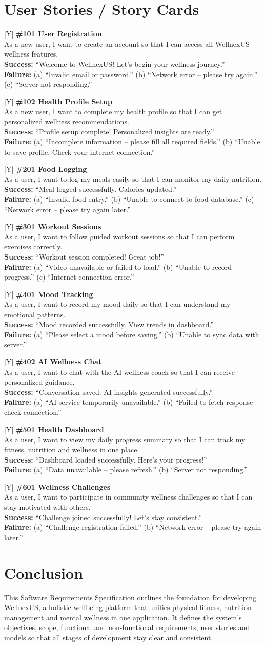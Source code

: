 \documentclass[11pt,a4paper]{report}
\newcommand{\storycard}[4]{\par\medskip\noindent\small
 \begin{tabularx}{\textwidth}{|Y|}\hline
 \textbf{\##1}\\\hline #2\\\hline
 \textbf{Success:} ``#3''\\\hline
 \textbf{Failure:} #4\\\hline\end{tabularx}\normalsize\par}
\begin{document}
\section{User Stories / Story Cards}
\storycard{101 User Registration}{As a new user, I want to create an account so that I can access all WellnexUS wellness features.}{Welcome to WellnexUS! Let's begin your wellness journey.}{(a) ``Invalid email or password.'' (b) ``Network error -- please try again.'' (c) ``Server not responding.''}
\storycard{102 Health Profile Setup}{As a new user, I want to complete my health profile so that I can get personalized wellness recommendations.}{Profile setup complete! Personalized insights are ready.}{(a) ``Incomplete information -- please fill all required fields.'' (b) ``Unable to save profile. Check your internet connection.''}
\storycard{201 Food Logging}{As a user, I want to log my meals easily so that I can monitor my daily nutrition.}{Meal logged successfully. Calories updated.}{(a) ``Invalid food entry.'' (b) ``Unable to connect to food database.'' (c) ``Network error -- please try again later.''}
\storycard{301 Workout Sessions}{As a user, I want to follow guided workout sessions so that I can perform exercises correctly.}{Workout session completed! Great job!}{(a) ``Video unavailable or failed to load.'' (b) ``Unable to record progress.'' (c) ``Internet connection error.''}
\storycard{401 Mood Tracking}{As a user, I want to record my mood daily so that I can understand my emotional patterns.}{Mood recorded successfully. View trends in dashboard.}{(a) ``Please select a mood before saving.'' (b) ``Unable to sync data with server.''}
\storycard{402 AI Wellness Chat}{As a user, I want to chat with the AI wellness coach so that I can receive personalized guidance.}{Conversation saved. AI insights generated successfully.}{(a) ``AI service temporarily unavailable.'' (b) ``Failed to fetch response -- check connection.''}
\storycard{501 Health Dashboard}{As a user, I want to view my daily progress summary so that I can track my fitness, nutrition and wellness in one place.}{Dashboard loaded successfully. Here's your progress!}{(a) ``Data unavailable -- please refresh.'' (b) ``Server not responding.''}
\storycard{601 Wellness Challenges}{As a user, I want to participate in community wellness challenges so that I can stay motivated with others.}{Challenge joined successfully! Let's stay consistent.}{(a) ``Challenge registration failed.'' (b) ``Network error -- please try again later.''}

\section*{Conclusion}
This Software Requirements Specification outlines the foundation for developing WellnexUS, a holistic wellbeing platform that unifies physical fitness, nutrition management and mental wellness in one application. It defines the system's objectives, scope, functional and non-functional requirements, user stories and models so that all stages of development stay clear and consistent.
\end{document}
